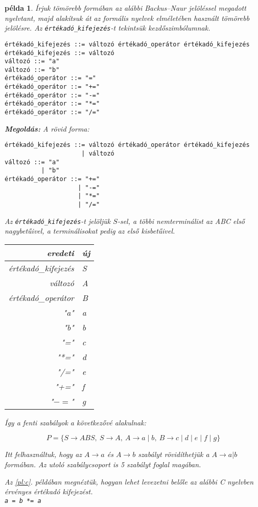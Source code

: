 \documentclass[a4paper]{article}
\newtheorem{pelda}{példa}[section]
\begin{document}
\begin{pelda}
Írjuk tömörebb formában az alábbi Backus--Naur jelöléssel megadott nyelvtant,
majd alakítsuk át az formális nyelvek elméletében használt tömörebb
jelölésre. Az \verb+értékadó_kifejezés+-t tekintsük kezdőszimbólumnak.
\vspace{1ex}
\begin{verbatim}
értékadó_kifejezés ::= változó értékadó_operátor értékadó_kifejezés
értékadó_kifejezés ::= változó
változó ::= "a"
változó ::= "b"
értékadó_operátor ::= "="
értékadó_operátor ::= "+="
értékadó_operátor ::= "-="
értékadó_operátor ::= "*="
értékadó_operátor ::= "/="
\end{verbatim}


\textbf{Megoldás:}
A rövid forma:

\vspace{1ex}
\begin{verbatim}
értékadó_kifejezés ::= változó értékadó_operátor értékadó_kifejezés
                     | változó
változó ::= "a"
          | "b"
értékadó_operátor ::= "+="
                    | "-="
                    | "*="
                    | "/="
\end{verbatim}
\vspace{1ex}

Az \verb+értékadó_kifejezés+-t jelöljük $S$-sel, a többi nemterminálist az
ABC első nagybetűivel, a terminálisokat pedig az első kisbetűivel.

{\it
\begin{tabular}{|r|l|}
\hline
eredeti & új\\
\hline
értékadó\_kifejezés& S\\
változó&A\\
értékadó\_operátor&B\\
"a"&a\\
"b"&b\\
"="& c\\
"*="& d\\
"/="& e\\
"+="& f\\
"$-=$"& g\\
\hline
\end{tabular}
}

Így a fenti szabályok a következővé alakulnak:

\[P=\{ S \to ABS,\: S\to A,\: A\to a \mid b,\: B\to c \mid d \mid e \mid
f \mid g \}\]

Itt felhasználtuk, hogy az $A\to a$ és $A\to b$ szabályt rövidíthetjük a
$A\to a|b$ formában. Az utoló szabálycsoport is 5 szabályt foglal
magában.

Az \ref{pl:c}.  példában megnéztük, hogyan lehet levezetni belőle az
alábbi C nyelvben érvényes értékadó kifejezést.\\
\verb!a = b *= a!
\end{pelda}
\end{document}
